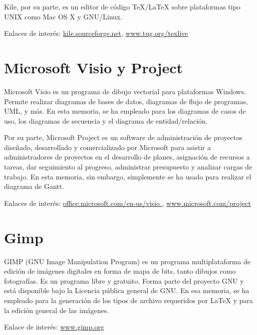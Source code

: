 Kile, por su parte, es un editor de código TeX/LaTeX sobre plataformas tipo
UNIX como Mac OS X y GNU/Linux.

Enlaces de interés: \href{http://kile.sourceforge.net/}{kile.sourceforge.net},
\href{ http://www.tug.org/texlive/}{www.tug.org/texlive}

\section*{Microsoft Visio y Project}

Microsoft Visio es un programa de dibujo vectorial para plataformas Windows.
Permite realizar diagramas de bases de datos, diagramas de flujo de programas,
UML, y más. En esta memoria, se ha empleado para los diagramas de casos de uso,
los diagramas de secuencia y  el diagrama de entidad/relación.

Por su parte, Microsoft Project es un software de administración de proyectos
diseñado, desarrollado y comercializado por Microsoft para asistir a
administradores de proyectos en el desarrollo de planes, asignación de recursos
a tareas, dar seguimiento al progreso, administrar presupuesto y analizar cargas
de trabajo. En esta memoria, sin embargo, simplemente se ha usado para realizar
el diagrama de Gantt.

Enlaces de interés:
\href{http://office.microsoft.com/en-us/visio/}{office.microsoft.com/en-us/visio
}, \newline \href{http://www.microsoft.com/project}{www.microsoft.com/project}

\section*{Gimp}

GIMP (GNU Image Manipulation Program) es un programa multiplataforma de edición
de imágenes digitales en forma de mapa de bits, tanto dibujos como fotografías.
Es un programa libre y gratuito. Forma parte del proyecto GNU y está disponible
bajo la Licencia pública general de GNU. En esa memoria, se ha empleado para la
generación de los tipos de archivo  requeridos por LaTeX y para la edición
general de las imágenes.

Enlace de interés: \href{http://www.gimp.org/}{www.gimp.org}
